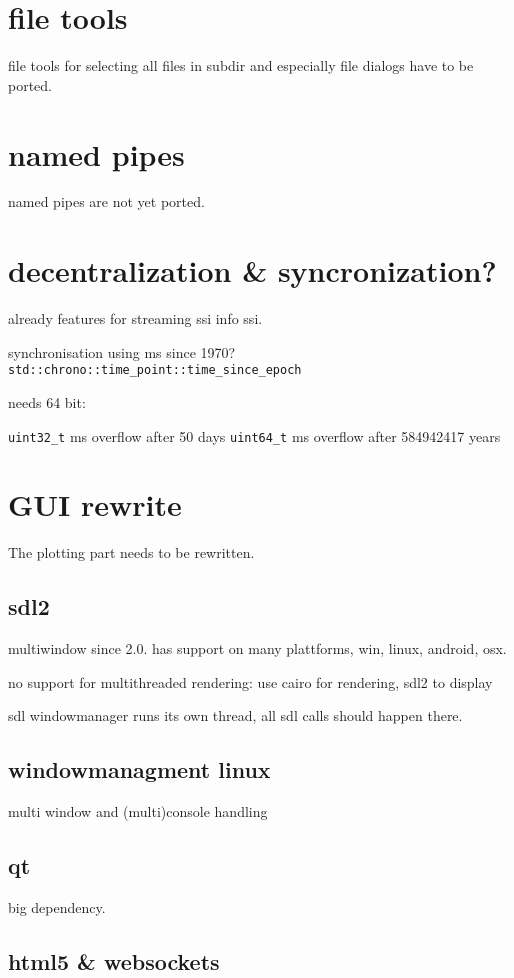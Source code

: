 \documentclass[
10pt, %
a4paper, %
oneside, %
headinclude,footinclude, %
BCOR5mm, %
]{scrartcl}
\begin{document}
\section{file tools}
file tools for selecting all files in subdir and especially file dialogs have to be ported.

\section{named pipes}
named pipes are not yet ported.

\section{decentralization \& syncronization?}

already features for streaming ssi info ssi.

synchronisation using ms since 1970?
\verb|std::chrono::time_point::time_since_epoch|

needs 64 bit:

	\verb|uint32_t| ms overflow after 50 days
	\verb|uint64_t| ms overflow after 584942417 years

\section{GUI rewrite}

The plotting part needs to be rewritten.
\subsection{sdl2}
multiwindow since 2.0.
has support on many plattforms, win, linux, android, osx.

no support for multithreaded rendering:
use cairo for rendering, sdl2 to display

sdl windowmanager runs its own thread, all sdl calls should happen there.
\subsection{windowmanagment linux}
multi window and (multi)console handling

\subsection{qt}
big dependency.

\subsection{html5 \& websockets}
\end{document}

